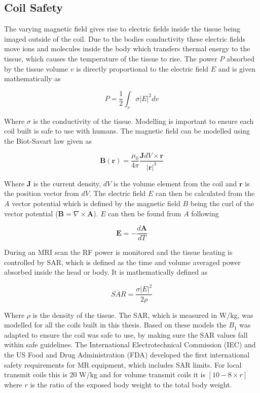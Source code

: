 \subsection{Coil Safety}

The varying magnetic field gives rise to electric fields inside the tissue being imaged outside of the coil. Due to the bodies conductivity these electric fields move ions and molecules inside the body which transfers thermal energy to the tissue, which causes the temperature of the tissue to rise. The power $P$ absorbed by the tissue volume $v$ is directly proportional to the electric field $E$ and is given mathematically as 

\begin{equation}
    P = \frac{1}{2}\int_v \sigma|E|^2dv
\end{equation}

Where $\sigma$ is the conductivity of the tissue. Modelling is important to ensure each coil built is safe to use with humans. The magnetic field can be modelled using the Biot-Savart law given as 

\begin{equation}
    \mathbf{B(r)} = \frac{\mu_0}{4\pi}\frac{\mathbf{J}dV \times \mathbf{r}}{|\mathbf{r}|^3}
\end{equation}

Where $\mathbf{J}$ is the current density, $dV$ is the volume element from the coil and $\mathbf{r}$ is the position vector from $dV$. The electric field $E$ can then be calculated from the $A$ vector potential which is defined by the magnetic field $B$ being the curl of the vector potential ($\mathbf{B} = \nabla \times \mathbf{A}$). $E$ can then be found from $A$ following

\begin{equation}
    \mathbf{E} = -\frac{d\mathbf{A}}{dT}
\end{equation}

During an \ac{MRI} scan the \ac{RF} power is monitored and the tissue heating is controlled by \ac{SAR}, which is defined as the time and volume averaged power absorbed inside the head or body. It is mathematically defined as 

\begin{equation}
    SAR = \frac{\sigma|E|^2}{2\rho}
\end{equation}

Where $\rho$ is the density of the tissue. The \ac{SAR}, which is measured in W/kg, was modelled for all the coils built in this thesis. Based on these models the $B_1$ was adapted to ensure the coil was safe to use, by making sure the \ac{SAR} values fall within safe guidelines. The International Electrotechnical Commission (IEC) and the US Food and Drug Administration (FDA) developed the first international safety requirements for MR equipment, which includes \ac{SAR} limits. For local transmit coils this is 20 W/kg and for volume transmit coils it is $[10 - 8\times r]$ where $r$ is the ratio of the exposed body weight to the total body weight.

